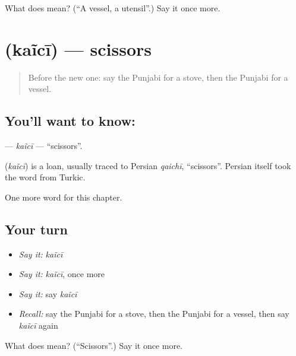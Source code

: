 \begin{tcolorbox}[breakable,colback=teal!4,colframe=teal!35!black,title={Before you move on}]
What does  mean? (\textquotedblleft{}A vessel, a utensil\textquotedblright{}.) Say it once more.
\end{tcolorbox}
\section[\texorpdfstring{\pa{ਕੈਂਚੀ} (kaĩcī)}{ਕੈਂਚੀ (kaĩcī)}]{ (kaĩcī) — scissors}

\label{lesson:PA-C115-kaici}



\begin{quote}
Before the new one: say the Punjabi for a stove, then the Punjabi for a vessel.
\end{quote}

\subsection*{You'll want to know: }
\textbf{} — \emph{kaĩcī} — \textquotedblleft{}scissors\textquotedblright{}.

\begin{cousinweb}
\textbf{} (\emph{kaĩcī}) is a loan, usually traced to Persian \emph{qaichī}, \textquotedblleft{}scissors\textquotedblright{}. Persian itself took the word from Turkic.
\end{cousinweb}

\begin{grammarlens}[title={What you've built}]
One more word for this chapter.
\end{grammarlens}

\subsection*{Your turn}
\begin{itemize}
\raggedright
  \item \emph{Say it:} \emph{kaĩcī}
  \item \emph{Say it:} \emph{kaĩcī}, once more
  \item \emph{Say it:} say \emph{kaĩcī}
  \item \emph{Recall:} say the Punjabi for a stove, then the Punjabi for a vessel, then say \emph{kaĩcī} again
\end{itemize}

\begin{tcolorbox}[breakable,colback=teal!4,colframe=teal!35!black,title={Before you move on}]
What does  mean? (\textquotedblleft{}Scissors\textquotedblright{}.) Say it once more.
\end{tcolorbox}
